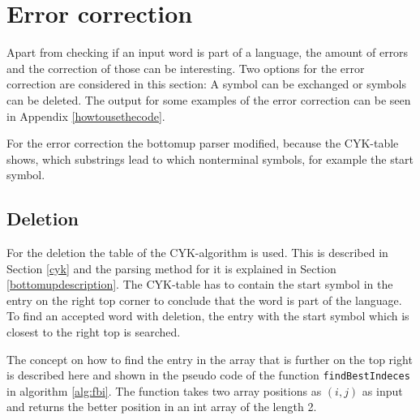 \documentclass[a4paper, 11pt]{article}
\begin{document}








\pagebreak










\section{Error correction}
\label{errorcorrection}

Apart from checking if an input word is part of a language, the amount of errors and the correction of those can be interesting.
Two options for the error correction are considered in this section: A symbol can be exchanged or symbols can be deleted. The output for some examples of the error correction can be seen in Appendix \ref{howtousethecode}.

For the error correction the bottomup parser modified, because the CYK-table shows, which substrings lead to which nonterminal symbols, for example the start symbol.





\subsection{Deletion}
\label{deletion}

For the deletion the table of the CYK-algorithm is used. This is described in Section \ref{cyk} and the parsing method for it is explained in Section \ref{bottomupdescription}.
The CYK-table has to contain the start symbol in the entry on the right top corner to conclude that the word is part of the language. To find an accepted word with deletion, the entry with the start symbol which is closest to the right top is searched. 

The concept on how to find the entry in the array that is further on the top right is described here and shown in the pseudo code of the function \texttt{findBestIndeces} in algorithm \ref{alg:fbi}. The function takes two array positions as $(i,j)$ as input and returns the better position in an int array of the length 2.
\end{document}
